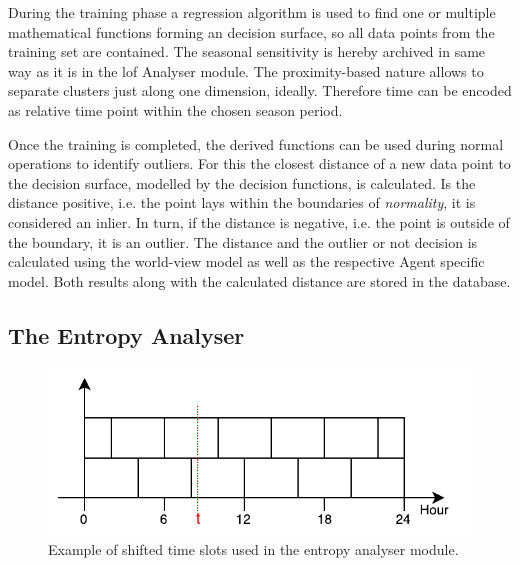 During the training phase a regression algorithm is used to find one or multiple mathematical functions forming an decision surface, so all data points from the training set are contained.
The seasonal sensitivity is hereby archived in same way as it is in the \gls{lof} Analyser module. The proximity-based nature allows to separate clusters just along one dimension, ideally. Therefore time can be encoded as relative time point within the chosen season period.

Once the training is completed, the derived functions can be used during normal operations to identify outliers.
For this the closest distance of a new data point to the decision surface, modelled by the decision functions, is calculated.
Is the distance positive, i.e. the point lays within the boundaries of \emph{normality}, it is considered an inlier.
In turn, if the distance is negative, i.e. the point is outside of the boundary, it is an outlier.
The distance and the outlier or not decision is calculated using the world-view model as well as the respective Agent specific model.
Both results along with the calculated distance are stored in the database.


\subsection{The Entropy Analyser}
\label{sec:concept:anal:entropy}

\begin{figure}[h]
	\centering
	\includegraphics[]{figures/300-time-slots.pdf}
	\caption{Example of shifted time slots used in the entropy analyser module.}
	\label{fig:concept:time-slots}
\end{figure}

